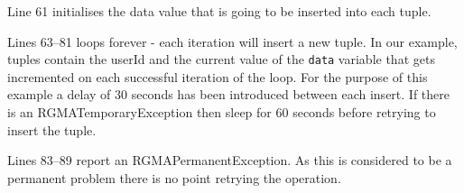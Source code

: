 Line 61 initialises the data value that is going to be inserted into
each tuple.

Lines 63--81 loops forever - each iteration will insert a new
tuple. In our example, tuples contain the userId and the current value
of the \texttt{data} variable that gets incremented on each successful
iteration of the loop. For the purpose of this example a delay of 30
seconds has been introduced between each insert. If there is an
RGMATemporaryException then sleep for 60 seconds before retrying to
insert the tuple.

Lines 83--89 report an RGMAPermanentException. As this is considered
to be a permanent problem there is no point retrying the operation.
